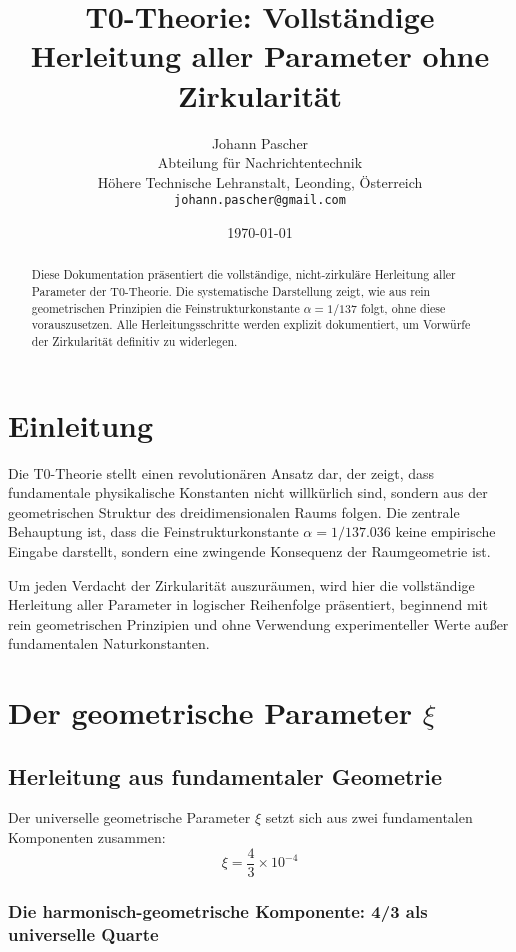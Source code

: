 \documentclass[12pt,a4paper]{article}
\title{T0-Theorie: Vollst\"andige Herleitung aller Parameter ohne Zirkularit\"at}
\author{Johann Pascher\\
	Abteilung f\"ur Nachrichtentechnik\\
	H\"ohere Technische Lehranstalt, Leonding, \"Osterreich\\
	\texttt{johann.pascher@gmail.com}}
\date{\today}
\newcommand{\xipar}{\xi}                    %
\theoremstyle{definition}
\begin{document}
	
	\maketitle
	
	\begin{abstract}
		Diese Dokumentation pr\"asentiert die vollst\"andige, nicht-zirkul\"are Herleitung aller Parameter der T0-Theorie. Die systematische Darstellung zeigt, wie aus rein geometrischen Prinzipien die Feinstrukturkonstante $\alpha = 1/137$ folgt, ohne diese vorauszusetzen. Alle Herleitungsschritte werden explizit dokumentiert, um Vorw\"urfe der Zirkularit\"at definitiv zu widerlegen.
	\end{abstract}
	
	\section{Einleitung}
	
	Die T0-Theorie stellt einen revolution\"aren Ansatz dar, der zeigt, dass fundamentale physikalische Konstanten nicht willk\"urlich sind, sondern aus der geometrischen Struktur des dreidimensionalen Raums folgen. Die zentrale Behauptung ist, dass die Feinstrukturkonstante $\alpha = 1/137.036$ keine empirische Eingabe darstellt, sondern eine zwingende Konsequenz der Raumgeometrie ist.
	
	Um jeden Verdacht der Zirkularit\"at auszur\"aumen, wird hier die vollst\"andige Herleitung aller Parameter in logischer Reihenfolge pr\"asentiert, beginnend mit rein geometrischen Prinzipien und ohne Verwendung experimenteller Werte au\ss er fundamentalen Naturkonstanten.
\tableofcontents
\newpage	
\section{Der geometrische Parameter $\xipar$}

\subsection{Herleitung aus fundamentaler Geometrie}

Der universelle geometrische Parameter $\xipar$ setzt sich aus zwei fundamentalen Komponenten zusammen:
\begin{equation}
	\xipar = \frac{4}{3} \times 10^{-4}
\end{equation}

\subsubsection{Die harmonisch-geometrische Komponente: 4/3 als universelle Quarte}
\end{document}

